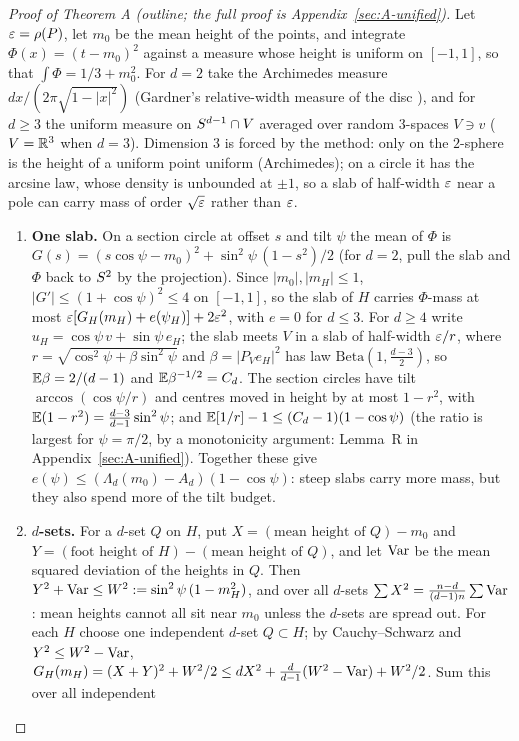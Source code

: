 \documentclass[11pt]{article}
\begin{document}
\begin{proof}[Proof of Theorem A (outline; the full proof is Appendix~\ref{sec:A-unified})]
Let $\varepsilon=\rho(P)$, let $m_0$ be the mean height of the points, and integrate $\Phi(x)=(t-m_0)^2$
against a measure whose height is uniform on $[-1,1]$, so that $\int\Phi=1/3+m_0^2$. For $d=2$ take the
Archimedes measure $dx/(2\pi\sqrt{1-|x|^2})$ (Gardner's relative-width measure of the disc
\cite{Gardner}), and for $d\ge3$ the uniform measure on $S^{d-1}\cap V$ averaged over random
$3$-spaces $V\ni v$ ($V=\mathbb{R}^3$ when $d=3$). Dimension $3$ is forced by the method: only on the
$2$-sphere is the height of a uniform point uniform (Archimedes); on a circle it has the arcsine law,
whose density is unbounded at $\pm1$, so a slab of half-width $\varepsilon$ near a pole can carry mass of order
$\sqrt{\varepsilon}$ rather than $\varepsilon$.
\begin{enumerate}
\item \textbf{One slab.} On a section circle at offset $s$ and tilt $\psi$ the mean of $\Phi$ is
$G(s)=(s\cos\psi-m_0)^2+\sin^2\psi\,(1-s^2)/2$ (for $d=2$, pull the slab and $\Phi$ back to
$S^2$ by the projection). Since $|m_0|,|m_H|\le1$, $|G'|\le(1+\cos\psi)^2\le4$ on $[-1,1]$, so
the slab of $H$ carries $\Phi$-mass at most $\varepsilon[G_H(m_H)+e(\psi_H)]+2\varepsilon^2$, with $e=0$ for
$d\le3$. For $d\ge4$ write $u_H=\cos\psi\,v+\sin\psi\,e_H$; the slab meets $V$ in a slab of half-width
$\varepsilon/r$, where $r=\sqrt{\cos^2\psi+\beta\sin^2\psi}$ and $\beta=|P_Ve_H|^2$ has law
$\mathrm{Beta}(1,\frac{d-3}2)$, so $\mathbb{E}\beta=2/(d-1)$ and $\mathbb{E}\beta^{-1/2}=C_d$. The section circles have
tilt $\arccos(\cos\psi/r)$ and centres moved in height by at most $1-r^2$, with
$\mathbb{E}(1-r^2)=\frac{d-3}{d-1}\sin^2\psi$; and
$\mathbb{E}[1/r]-1\le(C_d-1)(1-\cos\psi)$ (the ratio is largest for $\psi=\pi/2$, by a monotonicity argument: Lemma~R in Appendix~\ref{sec:A-unified}).
Together these give $e(\psi)\le(\Lambda_d(m_0)-A_d)(1-\cos\psi)$: steep slabs carry more mass, but they
also spend more of the tilt budget.
\item \textbf{$d$-sets.} For a $d$-set $Q$ on $H$, put $X=(\text{mean height of }Q)-m_0$ and
$Y=(\text{foot height of }H)-(\text{mean height of }Q)$, and let $\operatorname{Var}$ be the mean squared deviation of
the heights in $Q$. Then $Y^2+\operatorname{Var}\le W^2:=\sin^2\psi\,(1-m_H^2)$, and over all $d$-sets
$\sum X^2=\frac{n-d}{(d-1)n}\sum\operatorname{Var}$: mean heights cannot all sit near $m_0$ unless the $d$-sets are
spread out. For each $H$ choose one independent $d$-set $Q\subset H$; by Cauchy--Schwarz and $Y^2\le W^2-\operatorname{Var}$,
$G_H(m_H)=(X+Y)^2+W^2/2\le dX^2+\frac d{d-1}(W^2-\operatorname{Var})+W^2/2$. Sum this over all independent

\end{enumerate}
\end{proof}
\end{document}
